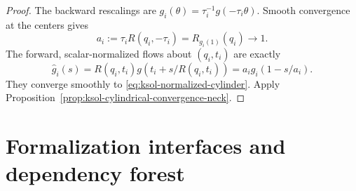 \documentclass[10pt]{coll-l}
\theoremstyle{definition}
\theoremstyle{remark}
\numberwithin{section}{chapter}
\numberwithin{equation}{chapter}
\begin{document}
\begin{proof}
The backward rescalings are
$g_i(\theta)=\tau_i^{-1}g(-\tau_i\theta)$.  Smooth convergence at the
centers gives
\[
 a_i:=\tau_iR(q_i,-\tau_i)=R_{g_i(1)}(q_i)\longrightarrow1.
\]
The forward, scalar-normalized flows about $(q_i,t_i)$ are exactly
\begin{equation}
 \widehat g_i(s)
 =R(q_i,t_i)g(t_i+s/R(q_i,t_i))
 =a_i g_i(1-s/a_i).                                   \label{eq:ksol-backward-forward-neck-bridge}
\end{equation}
They converge smoothly to \eqref{eq:ksol-normalized-cylinder}.  Apply
Proposition~\ref{prop:ksol-cylindrical-convergence-neck}.
\end{proof}

\section{Formalization interfaces and dependency forest}
\label{sec:ksol-formalization}
\end{document}
